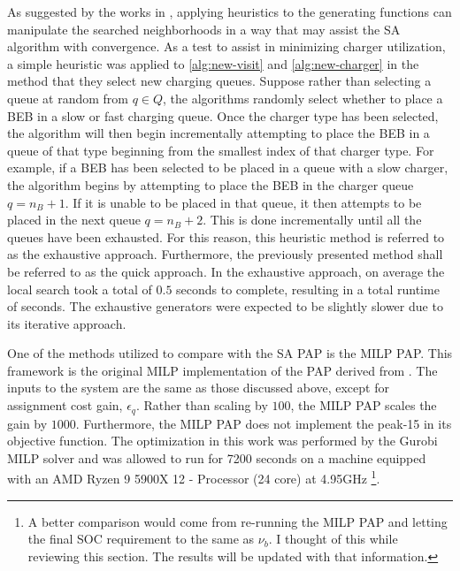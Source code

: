 \documentclass[11pt,a4paper,final]{article}
\newcommand{\tempcnt}{1517 }                                                    %
\newcommand{\exhaustivelocal}{0.5 }                                             %
\begin{document}
As suggested by the works in \cite{Zhang_2010,Xinchao_2011}, applying heuristics to the generating functions can
manipulate the searched neighborhoods in a way that may assist the SA algorithm with convergence. As a test to assist in
minimizing charger utilization, a simple heuristic was applied to \ref{alg:new-visit} and \ref{alg:new-charger} in the
method that they select new charging queues. Suppose rather than selecting a queue at random from \(q \in Q\), the
algorithms randomly select whether to place a BEB in a slow or fast charging queue. Once the charger type has been
selected, the algorithm will then begin incrementally attempting to place the BEB in a queue of that type beginning from
the smallest index of that charger type. For example, if a BEB has been selected to be placed in a queue with a slow
charger, the algorithm begins by attempting to place the BEB in the charger queue \(q = n_B + 1\). If it is unable to be
placed in that queue, it then attempts to be placed in the next queue \(q = n_B + 2\). This is done incrementally until
all the queues have been exhausted. For this reason, this heuristic method is referred to as the exhaustive approach.
Furthermore, the previously presented method shall be referred to as the quick approach. In the exhaustive approach, on
average the local search took a total of \(\exhaustivelocal\) seconds to complete, resulting in a total runtime of
\fpeval{\exhaustivelocal * \tempcnt} seconds. The exhaustive generators were expected to be slightly slower
due to its iterative approach.

One of the methods utilized to compare with the SA PAP is the MILP PAP. This framework is the original MILP
implementation of the PAP derived from \cite{qarebagh-2019-optim-sched}. The inputs to the system are the same as those
discussed above, except for assignment cost gain, \(\epsilon_q\). Rather than scaling by \(100\), the MILP PAP scales the gain by
\(1000\). Furthermore, the MILP PAP does not implement the peak-15 in its objective function. The optimization in this
work was performed by the Gurobi MILP solver and was allowed to run for 7200 seconds on a machine equipped with an AMD
Ryzen 9 5900X 12 - Processor (24 core) at 4.95GHz \cite{gurobi-2021-gurob-optim} \footnote{A better comparison would come from re-running the MILP PAP and letting the final SOC requirement to the same as
\(\nu_b\). I thought of this while reviewing this section. The results will be updated with that information.}.
\end{document}
